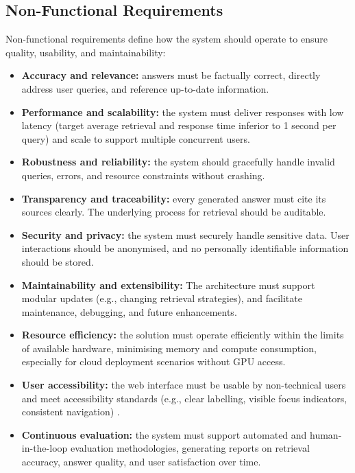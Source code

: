 \begin{spacing}{1.5}
\subsection{Non-Functional Requirements}
Non-functional requirements define how the system should operate to ensure quality, usability, and maintainability:
\begin{itemize}
    \item \textbf{Accuracy and relevance:} answers must be factually correct, directly address user queries, and reference up-to-date information.
    \item \textbf{Performance and scalability:} the system must deliver responses with low latency (target average retrieval and response time inferior to 1 second per query) and scale to support multiple concurrent users.
    \item \textbf{Robustness and reliability:} the system should gracefully handle invalid queries, errors, and resource constraints without crashing.
    \item \textbf{Transparency and traceability:} every generated answer must cite its sources clearly. The underlying process for retrieval should be auditable.
    \item \textbf{Security and privacy:} the system must securely handle sensitive data. User interactions should be anonymised, and no personally identifiable information should be stored.
    \item \textbf{Maintainability and extensibility:} The architecture must support modular updates (e.g., changing retrieval strategies), and facilitate maintenance, debugging, and future enhancements.
    \item \textbf{Resource efficiency:} the solution must operate efficiently within the limits of available hardware, minimising memory and compute consumption, especially for cloud deployment scenarios without GPU access.
    \item \textbf{User accessibility:} the web interface must be usable by non-technical users and meet accessibility standards (e.g., clear labelling, visible focus indicators, consistent navigation) \parencite{noauthor_web_nodate}.
    \item \textbf{Continuous evaluation:} the system must support automated and human-in-the-loop evaluation methodologies, generating reports on retrieval accuracy, answer quality, and user satisfaction over time.
\end{itemize}


\end{spacing}